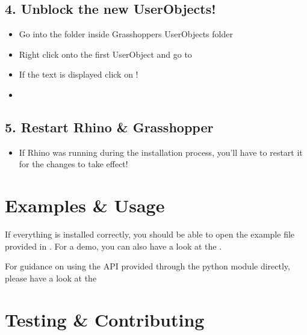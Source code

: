 \documentclass[letterpaper,10pt,english]{sphinxmanual}
\begin{document}
\subsection{4. Unblock the new UserObjects!}
\label{\detokenize{README:unblock-the-new-userobjects}}\label{\detokenize{README:id5}}\begin{itemize}
\item {} 
Go into the  folder inside Grasshoppers UserObjects
folder

\item {} 
Right click onto the first UserObject and go to 

\item {} 
If the text  is displayed
click on !

\item {} 

\end{itemize}


\subsection{5. Restart Rhino \& Grasshopper}
\label{\detokenize{README:restart-rhino-grasshopper}}\label{\detokenize{README:id6}}\begin{itemize}
\item {} 
If Rhino was running during the installation process, you’ll have to
restart it for the changes to take effect!

\end{itemize}


\section{Examples \& Usage}
\label{\detokenize{README:examples-usage}}\label{\detokenize{README:id7}}
If everything is installed correctly, you should be able to open the
example file provided in . For a demo, you can also have a
look at the .

For guidance on using the API provided through the python module
directly, please have a look at the


\section{Testing \& Contributing}
\label{\detokenize{README:testing-contributing}}\label{\detokenize{README:id8}}
\end{document}
